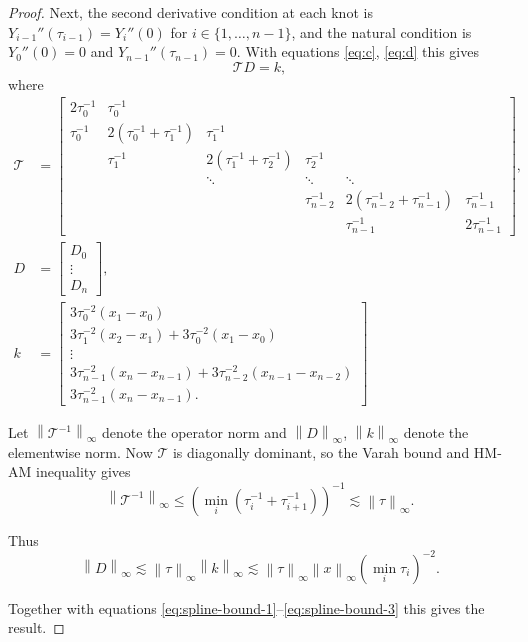 \documentclass{article}
\theoremstyle{plain}
\theoremstyle{definition}
\newcommand{\norm}[1]{\left\|#1\right\|}
\begin{document}
\begin{proof}
	Next, the second derivative condition at each knot is $Y_{i - 1}''(\tau_{i - 1}) = Y_i''(0)$ for $i \in \{1, \ldots, n - 1\}$, and the natural condition is $Y_0''(0) = 0$ and $Y_{n - 1}''(\tau_{n - 1}) = 0$. With equations \eqref{eq:c}, \eqref{eq:d} this gives
	\begin{equation*}
	\mathcal{T} D = k,
	\end{equation*}
	where
	\begin{align*}
	\mathcal{T} &= 
	\begin{bmatrix}
	2 \tau_0^{-1} & \tau_0^{-1}\\
	\tau_0^{-1} & 2 (\tau_0^{-1} + \tau_1^{-1}) & \tau_1^{-1}\\
	 & \tau_1^{-1} & 2 (\tau_1^{-1} + \tau_2^{-1}) & \tau_2^{-1}\\
	 && \ddots & \ddots & \ddots\\
	 &&& \tau_{n - 2}^{-1} & 2(\tau_{n - 2}^{-1} + \tau_{n - 1}^{-1}) & \tau_{n - 1}^{-1}\\
	 &&&& \tau_{n - 1}^{-1} & 2\tau_{n - 1}^{-1}
	\end{bmatrix},\\
	D &= 
	\begin{bmatrix}
	D_0\\
	\vdots\\
	D_n
	\end{bmatrix},\\
	k &=
	\begin{bmatrix}
	3 \tau_0^{-2} (x_1 - x_0)\\
	3 \tau_1^{-2} (x_2 - x_1) + 3 \tau_0^{-2} (x_1 - x_0)\\
	\vdots\\
	3 \tau_{n - 1}^{-2} (x_n - x_{n - 1}) + 3 \tau_{n - 2}^{-2} (x_{n - 1} - x_{n - 2})\\
	3 \tau_{n - 1}^{-2} (x_n - x_{n - 1}).
	\end{bmatrix}
	\end{align*}
	
	Let $\norm{\mathcal{T}^{-1}}_\infty$ denote the operator norm and $\norm{D}_\infty$, $\norm{k}_\infty$ denote the elementwise norm. Now $\mathcal{T}$ is diagonally dominant, so the Varah bound \cite{varah} and HM-AM inequality gives
	\begin{equation*}
	\norm{\mathcal{T}^{-1}}_\infty \leq (\min_i (\tau_i^{-1} + \tau_{i + 1}^{-1}))^{-1} \lesssim \norm{\tau}_\infty.
	\end{equation*}
	
	Thus
	\begin{equation*}
	\norm{D}_\infty \lesssim \norm{\tau}_\infty \norm{k}_\infty \lesssim \norm{\tau}_\infty \norm{x}_\infty (\min_i \tau_i)^{-2}.
	\end{equation*}
	
	Together with equations \eqref{eq:spline-bound-1}--\eqref{eq:spline-bound-3} this gives the result.
	\end{proof}
	
\end{document}

